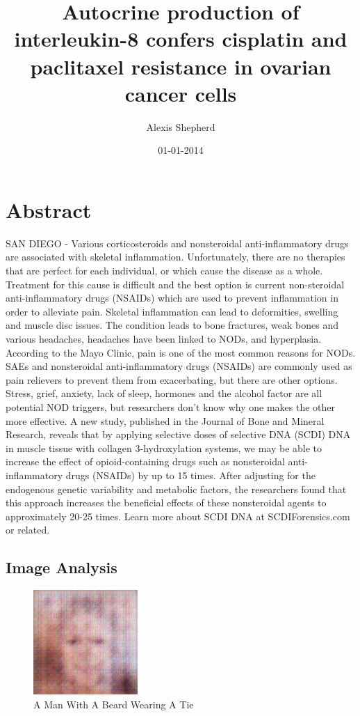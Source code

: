 \documentclass{article}%
\title{Autocrine production of interleukin{-}8 confers cisplatin and paclitaxel resistance in ovarian cancer cells}%
\author{Alexis Shepherd}%
\affil{School of Biosciences, University of Birmingham, Edgbaston, Birmingham B15 2TT, UK}%
\date{01{-}01{-}2014}%
\begin{document}
%
\normalsize%
\maketitle%
\section{Abstract}%
\label{sec:Abstract}%
SAN DIEGO {-} Various corticosteroids and nonsteroidal anti{-}inflammatory drugs are associated with skeletal inflammation. Unfortunately, there are no therapies that are perfect for each individual, or which cause the disease as a whole. Treatment for this cause is difficult and the best option is current non{-}steroidal anti{-}inflammatory drugs (NSAIDs) which are used to prevent inflammation in order to alleviate pain.\newline%
Skeletal inflammation can lead to deformities, swelling and muscle disc issues. The condition leads to bone fractures, weak bones and various headaches, headaches have been linked to NODs, and hyperplasia. According to the Mayo Clinic, pain is one of the most common reasons for NODs. SAEs and nonsteroidal anti{-}inflammatory drugs (NSAIDs) are commonly used as pain relievers to prevent them from exacerbating, but there are other options.\newline%
Stress, grief, anxiety, lack of sleep, hormones and the alcohol factor are all potential NOD triggers, but researchers don't know why one makes the other more effective. A new study, published in the Journal of Bone and Mineral Research, reveals that by applying selective doses of selective DNA (SCDI) DNA in muscle tissue with collagen 3{-}hydroxylation systems, we may be able to increase the effect of opioid{-}containing drugs such as nonsteroidal anti{-}inflammatory drugs (NSAIDs) by up to 15 times.\newline%
After adjusting for the endogenous genetic variability and metabolic factors, the researchers found that this approach increases the beneficial effects of these nonsteroidal agents to approximately 20{-}25 times.\newline%
Learn more about SCDI DNA at SCDIForensics.com or related.

%
\subsection{Image Analysis}%
\label{subsec:ImageAnalysis}%


\begin{figure}[h!]%
\centering%
\includegraphics[width=150px]{500_fake_images/samples_5_324.png}%
\caption{A Man With A Beard Wearing A Tie}%
\end{figure}

%
\end{document}
